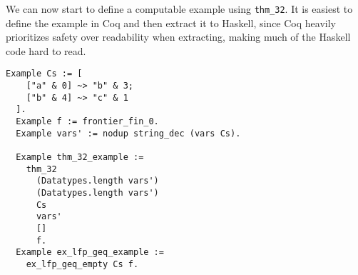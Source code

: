 We can now start to define a computable example using \lstinline{thm_32}.
It is easiest to define the example in Coq and then extract it to Haskell,
since Coq heavily prioritizes safety over readability when extracting,
making much of the Haskell code hard to read.


\begin{minipage}{\linewidth}
\begin{lstlisting}[language=Coq, label={lst:thm_32_coq_example}, caption={\lstinline{thm_32} example}]
  Example Cs := [
    ["a" & 0] ~> "b" & 3;
    ["b" & 4] ~> "c" & 1
  ].
  Example f := frontier_fin_0.
  Example vars' := nodup string_dec (vars Cs).

  Example thm_32_example :=
    thm_32
      (Datatypes.length vars')
      (Datatypes.length vars')
      Cs
      vars'
      []
      f.
  Example ex_lfp_geq_example :=
    ex_lfp_geq_empty Cs f.
\end{lstlisting}
\end{minipage}

